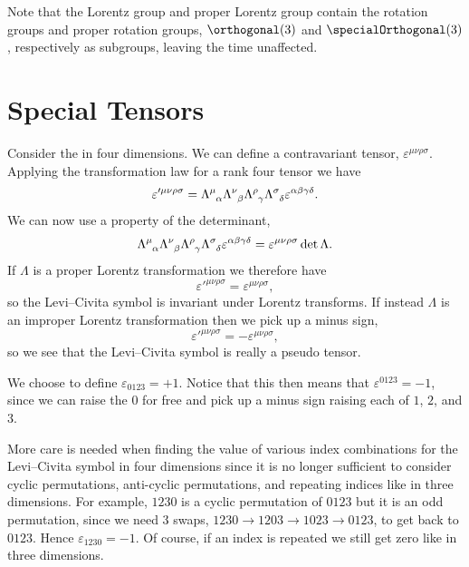 Note that the Lorentz group and proper Lorentz group contain the rotation groups and proper rotation groups, \(\orthogonal(3)\) and \(\specialOrthogonal(3)\), respectively as subgroups, leaving the time unaffected.

\section{Special Tensors}
Consider the  in four dimensions.
We can define a contravariant tensor, \(\varepsilon^{\mu\nu\rho\sigma}\).
Applying the transformation law for a rank four tensor we have
\begin{equation}
    \varepsilon'^{\mu\nu\rho\sigma} = \tensor{\Lambda}{^\mu_\alpha} \tensor{\Lambda}{^\nu_\beta} \tensor{\Lambda}{^\rho_\gamma} \tensor{\Lambda}{^\sigma_\delta} \varepsilon^{\alpha\beta\gamma\delta}.
\end{equation}
We can now use a property of the determinant,
\begin{equation}
    \tensor{\Lambda}{^\mu_\alpha} \tensor{\Lambda}{^\nu_\beta} \tensor{\Lambda}{^\rho_\gamma} \tensor{\Lambda}{^\sigma_\delta} \varepsilon^{\alpha\beta\gamma\delta} = \varepsilon^{\mu\nu\rho\sigma} \det\Lambda.
\end{equation}
If \(\Lambda\) is a proper Lorentz transformation we therefore have
\begin{equation}
    \varepsilon'^{\mu\nu\rho\sigma} = \varepsilon^{\mu\nu\rho\sigma},
\end{equation}
so the Levi--Civita symbol is invariant under Lorentz transforms.
If instead \(\Lambda\) is an improper Lorentz transformation then we pick up a minus sign,
\begin{equation}
    \varepsilon'^{\mu\nu\rho\sigma} = -\varepsilon^{\mu\nu\rho\sigma},
\end{equation}
so we see that the Levi--Civita symbol is really a pseudo tensor.

We choose to define \(\varepsilon_{0123} = +1\).
Notice that this then means that \(\varepsilon^{0123} = -1\), since we can raise the \(0\) for free and pick up a minus sign raising each of \(1\), \(2\), and \(3\).

More care is needed when finding the value of various index combinations for the Levi--Civita symbol in four dimensions since it is no longer sufficient to consider cyclic permutations, anti-cyclic permutations, and repeating indices like in three dimensions.
For example, \(1230\) is a cyclic permutation of \(0123\) but it is an odd permutation, since we need 3 swaps, \(1230 \to 1203 \to 1023 \to 0123\), to get back to \(0123\).
Hence \(\varepsilon_{1230} = -1\).
Of course, if an index is repeated we still get zero like in three dimensions.

